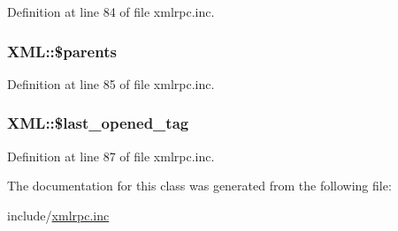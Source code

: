 Definition at line 84 of file xmlrpc.inc.\hypertarget{classXML_c10be009a77c59e80ce5562d4dd35532}{
\subsubsection{\setlength{\rightskip}{0pt plus 5cm}XML::\$parents}}
\label{classXML_c10be009a77c59e80ce5562d4dd35532}




Definition at line 85 of file xmlrpc.inc.\hypertarget{classXML_60e7e74df6643f50e0c6ea8252554b3d}{
\subsubsection{\setlength{\rightskip}{0pt plus 5cm}XML::\$last\_\-opened\_\-tag}}
\label{classXML_60e7e74df6643f50e0c6ea8252554b3d}




Definition at line 87 of file xmlrpc.inc.

The documentation for this class was generated from the following file:\begin{CompactItemize}
\item 
include/\hyperlink{xmlrpc_8inc}{xmlrpc.inc}\end{CompactItemize}
